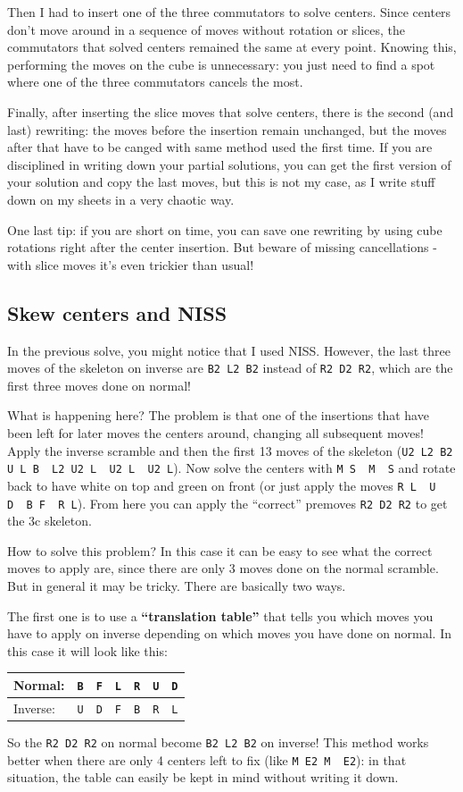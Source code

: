 \documentclass[11pt,a4paper]{book}
\newcommand{\p}{\textquotesingle}
\newcommand{\m}{\texttt}
\newcommand{\ps}{\p\,\,}
\begin{document}
Then I had to insert one of the three commutators to solve centers. Since centers don't move around in a sequence of moves without rotation or slices, the commutators that solved centers remained the same at every point. Knowing this, performing the moves on the cube is unnecessary: you just need to find a spot where one of the three commutators cancels the most.

Finally, after inserting the slice moves that solve centers, there is the second (and last) rewriting: the moves before the insertion remain unchanged, but the moves after that have to be canged with same method used the first time. If you are disciplined in writing down your partial solutions, you can get the first version of your solution and copy the last moves, but this is not my case, as I write stuff down on my sheets in a very chaotic way.

One last tip: if you are short on time, you can save one rewriting by using cube rotations right after the center insertion. But beware of missing cancellations - with slice moves it's even trickier than usual!

\subsection{Skew centers and NISS}
\label{sec:skewNISS}

In the previous solve, you might notice that I used NISS. However, the last three moves of the skeleton on inverse are \m{B2 L2 B2} instead of \m{R2 D2 R2}, which are the first three moves done on normal!

What is happening here? The problem is that one of the insertions that have been left for later moves the centers around, changing all subsequent moves! Apply the inverse scramble and then the first 13 moves of the skeleton (\m{U2 L2 B2 U L B\ps L2 U2 L\ps U2 L\ps U2 L}). Now solve the centers with \m{M S\ps M\ps S} and rotate back to have white on top and green on front (or just apply the moves \m{R L\ps U D\ps B F\ps R L\p}). From here you can apply the ``correct'' premoves \m{R2 D2 R2} to get the 3c skeleton.

How to solve this problem? In this case it can be easy to see what the correct moves to apply are, since there are only 3 moves done on the normal scramble. But in general it may be tricky. There are basically two ways.

The first one is to use a \textbf{``translation table''} that tells you which moves you have to apply on inverse depending on which moves you have done on normal. In this case it will look like this:
\begin{center}
\begin{tabular}{l|c|c|c|c|c|c}
Normal: &  \m{B} & \m{F} & \m{L} & \m{R} & \m{U} & \m{D}\\
\hline
Inverse: & \m{U} & \m{D} & \m{F} & \m{B} & \m{R} & \m{L}
\end{tabular}
\end{center}
So the \m{R2 D2 R2} on normal become \m{B2 L2 B2} on inverse! This method works better when there are only 4 centers left to fix (like \m{M E2 M\ps E2}): in that situation, the table can easily be kept in mind without writing it down.
\end{document}
